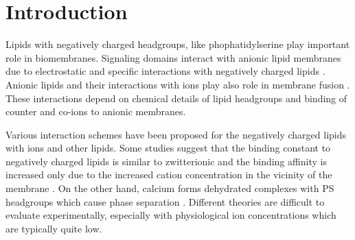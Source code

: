 \documentclass[journal=jpcbfk,manuscript=article]{achemso}
\begin{document}
 
 
 
 
 
 
\section{Introduction} 

Lipids with negatively charged headgroups, like phophatidylserine
play important role in biomembranes. Signaling domains interact with
anionic lipid membranes due to electrostatic and specific interactions
with negatively charged lipids \cite{lemmon08,leventis10}.
Anionic lipids and their interactions with ions play also role in membrane
fusion \cite{??}. 
These interactions depend on
chemical details of lipid headgroups and binding of counter and co-ions
to anionic membranes. 

Various interaction schemes have been proposed for the negatively charged
lipids with ions and other lipids. Some studies suggest that the
binding constant to negatively charged lipids is similar to zwitterionic
and the binding affinity is increased only due to the increased cation
concentration in the vicinity of the membrane \cite{seelig90,sinn06}.
On the other hand, calcium forms dehydrated complexes with PS headgroups
which cause phase separation \cite{hauser77,kurland79,hauser85,feigenson86,mattai89,roux90,roux91,boettcher11}.
Different theories are difficult to evaluate experimentally,
especially with physiological ion concentrations which are typically quite low.
\end{document}
